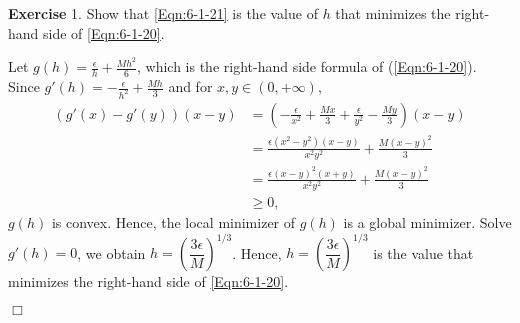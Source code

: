 \documentclass[UTF8,12pt,hyperref]{ctexart}
\makeatletter
\newenvironment{exercise}[1][{\color{blue}\bf Exercise}]%
{%
 \begin{center}   \begin{lrbox}{\@tempboxa}%
    \begin{minipage}{\textwidth}%
  {\color{blue}\bfseries
#1}   }{%
    \end{minipage}%
    \end{lrbox}
    \colorbox{green}{\noindent\usebox{\@tempboxa}} \end{center}  
}
\newenvironment{solve}[1][\color{blue}\bf Solve]{\begin{trivlist}
\item[\hskip \labelsep {\color{blue}\bfseries
#1}]}{\hfill$\Box$\end{trivlist}}
\makeatother
\begin{document}
\begin{exercise}1.\qquad
 Show that \eqref{Eqn:6-1-21} is the value of $h$ that minimizes the right-hand side of \eqref{Eqn:6-1-20}.
\end{exercise}   

\begin{solve}
   Let $g(h)=\frac{\epsilon}{h}+\frac{Mh^2}{6}$, which is the right-hand side formula of (\ref{Eqn:6-1-20}).
   Since $g'(h)=-\frac{\epsilon}{h^2}+\frac{Mh}{3}$ and for $x,y\in (0,+\infty)$, 
   \begin{align*}
      (g'(x)-g'(y))(x-y) &=  (-\frac{\epsilon}{x^2}+\frac{Mx}{3}+\frac{\epsilon}{y^2}-\frac{My}{3})(x-y)\\
      &=\frac{\epsilon(x^2-y^2)(x-y)}{x^2y^2} + \frac{M(x-y)^2}{3}\\
      &=\frac{\epsilon(x-y)^2(x+y)}{x^2y^2} + \frac{M(x-y)^2}{3}\\
      &\geqslant 0,
   \end{align*}
   $g(h)$ is convex. Hence, the local minimizer of $g(h)$ is a global minimizer.
   Solve $g'(h)=0$, we obtain $h = \left( \dfrac{3\epsilon}{M} \right)^{1/3}$. Hence, 
   $h = \left( \dfrac{3\epsilon}{M} \right)^{1/3}$ is the value that minimizes the right-hand side of \eqref{Eqn:6-1-20}.
  
\end{solve}
 
\end{document}
